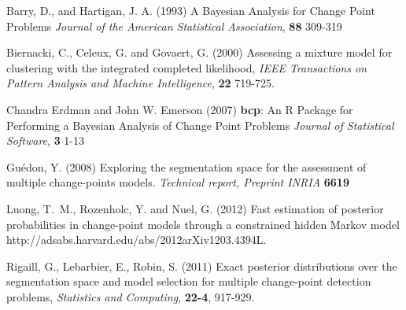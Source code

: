 \documentclass{bioinfo}
\begin{document}
\begin{methods}
\begin{thebibliography}{}

 Barry, D., and Hartigan, J. A. (1993) A Bayesian Analysis for Change Point Problems {\it Journal of the American Statistical Association}, {\bf 88} 309-319

 Biernacki, C., Celeux, G. and Govaert, G. (2000) Assessing a mixture model for clustering with the integrated completed likelihood, {\it{IEEE} Transactions on Pattern Analysis and Machine Intelligence}, {\bf 22} 719-725.

   Chandra Erdman and John W. Emerson (2007) {\bf{bcp}}: An {R} Package for Performing a Bayesian Analysis
      of Change Point Problems {\it Journal of Statistical Software}, {\bf 3} 1-13

 Gu\'{e}don, Y. (2008) Exploring the segmentation space for the assessment of multiple change-points models. {\it Technical report, Preprint INRIA} {\bf 6619}

 Luong, T.~M., Rozenholc, Y. and Nuel, G. (2012) Fast estimation of posterior probabilities in change-point models through a constrained hidden Markov model {http://adsabs.harvard.edu/abs/2012arXiv1203.4394L}.

 Rigaill, G., Lebarbier, E., Robin, S. (2011) Exact posterior distributions over the segmentation space and model selection for multiple change-point detection problems, {\it Statistics and Computing}, {\bf 22-4}, 917-929.

\end{thebibliography}
\end{methods}
\end{document}
